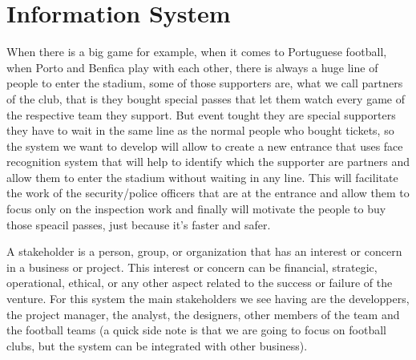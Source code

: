 \section{Information System}
When there is a big game for example, when it comes to Portuguese football, 
when Porto and Benfica play with each other, there is always a huge line of people to enter the stadium,
 some of those supporters are, what we  call partners of the club, that is they bought special passes 
 that let them watch every game of the respective team they support. But event tought they are special 
 supporters they have to wait in the same line as the normal people who bought tickets, so the 
 system we want to develop will allow to create a new entrance that uses face recognition system 
 that will help to identify which the supporter are partners and allow them to enter the 
 stadium without waiting in any line. This will facilitate the work of the security/police 
 officers that are at the entrance and allow them to focus only on the inspection 
 work and finally will motivate the people to buy those speacil passes, 
 just because it's faster and safer.
 
 A stakeholder is a person, group, or organization that has an interest or concern in a business or project. This interest or concern can be financial, strategic, operational, ethical, or any other aspect related to the success or failure of the venture. For this system the main stakeholders we see having are the developpers, the project manager, the analyst, the designers, other members of the team and the football teams (a quick side note is that we are going to focus on football clubs, but the system can be integrated with other business).